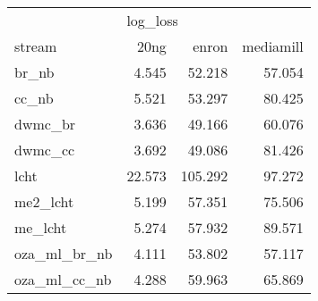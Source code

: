 \begin{tabular}{lrrr}
	\toprule
	                & \multicolumn{3}{l}{log\_loss}                       \\
	stream          & 20ng                          & enron   & mediamill \\
	\midrule
	br\_nb          & 4.545                         & 52.218  & 57.054    \\
	cc\_nb          & 5.521                         & 53.297  & 80.425    \\
	dwmc\_br        & 3.636                         & 49.166  & 60.076    \\
	dwmc\_cc        & 3.692                         & 49.086  & 81.426    \\
	lcht            & 22.573                        & 105.292 & 97.272    \\
	me2\_lcht       & 5.199                         & 57.351  & 75.506    \\
	me\_lcht        & 5.274                         & 57.932  & 89.571    \\
	oza\_ml\_br\_nb & 4.111                         & 53.802  & 57.117    \\
	oza\_ml\_cc\_nb & 4.288                         & 59.963  & 65.869    \\
	\bottomrule
\end{tabular}


